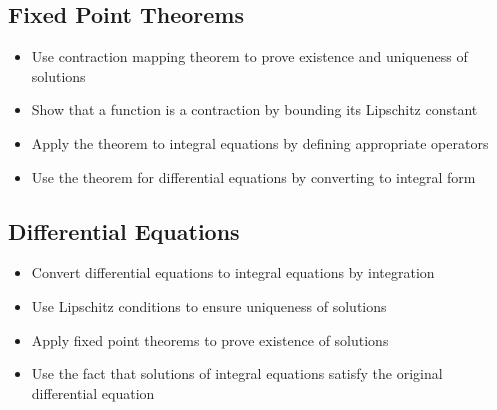 \subsection*{Fixed Point Theorems}
\begin{itemize}
\item Use contraction mapping theorem to prove existence and uniqueness of solutions
\item Show that a function is a contraction by bounding its Lipschitz constant
\item Apply the theorem to integral equations by defining appropriate operators
\item Use the theorem for differential equations by converting to integral form
\end{itemize}

\subsection*{Differential Equations}
\begin{itemize}
\item Convert differential equations to integral equations by integration
\item Use Lipschitz conditions to ensure uniqueness of solutions
\item Apply fixed point theorems to prove existence of solutions
\item Use the fact that solutions of integral equations satisfy the original differential equation
\end{itemize}
